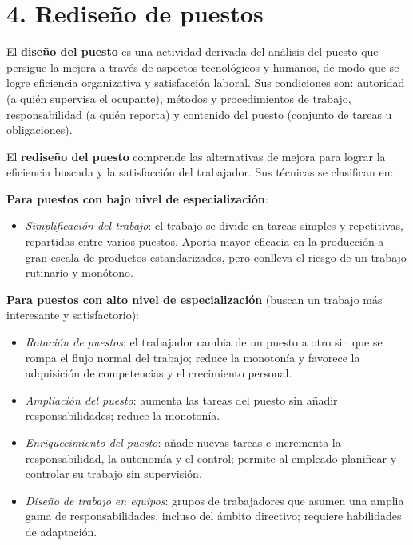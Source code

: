 \documentclass[12pt]{book} %
\providecommand{\tightlist}{%
  \setlength{\itemsep}{0pt}\setlength{\parskip}{0pt}}
\begin{document}
\hypertarget{rediseuxf1o-de-puestos}{%
\section{4. Rediseño de puestos}\label{rediseuxf1o-de-puestos}}

El \textbf{diseño del puesto} es una actividad derivada del análisis del
puesto que persigue la mejora a través de aspectos tecnológicos y
humanos, de modo que se logre eficiencia organizativa y satisfacción
laboral. Sus condiciones son: autoridad (a quién supervisa el ocupante),
métodos y procedimientos de trabajo, responsabilidad (a quién reporta) y
contenido del puesto (conjunto de tareas u obligaciones).

El \textbf{rediseño del puesto} comprende las alternativas de mejora
para lograr la eficiencia buscada y la satisfacción del trabajador. Sus
técnicas se clasifican en:

\textbf{Para puestos con bajo nivel de especialización}:

\begin{itemize}
\tightlist
\item
  \emph{Simplificación del trabajo}: el trabajo se divide en tareas
  simples y repetitivas, repartidas entre varios puestos. Aporta mayor
  eficacia en la producción a gran escala de productos estandarizados,
  pero conlleva el riesgo de un trabajo rutinario y monótono.
\end{itemize}

\textbf{Para puestos con alto nivel de especialización} (buscan un
trabajo más interesante y satisfactorio):

\begin{itemize}
\tightlist
\item
  \emph{Rotación de puestos}: el trabajador cambia de un puesto a otro
  sin que se rompa el flujo normal del trabajo; reduce la monotonía y
  favorece la adquisición de competencias y el crecimiento personal.
\item
  \emph{Ampliación del puesto}: aumenta las tareas del puesto sin añadir
  responsabilidades; reduce la monotonía.
\item
  \emph{Enriquecimiento del puesto}: añade nuevas tareas e incrementa la
  responsabilidad, la autonomía y el control; permite al empleado
  planificar y controlar su trabajo sin supervisión.
\item
  \emph{Diseño de trabajo en equipos}: grupos de trabajadores que asumen
  una amplia gama de responsabilidades, incluso del ámbito directivo;
  requiere habilidades de adaptación.
\end{itemize}
\end{document}
